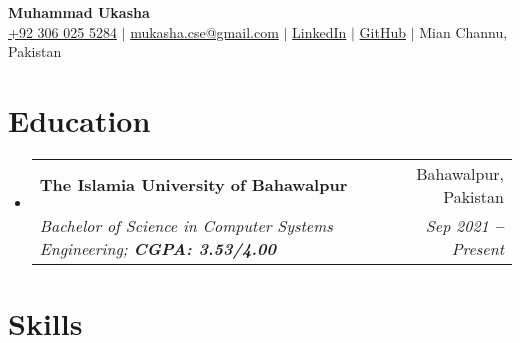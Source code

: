 \documentclass[a4paper,11pt]{article}
\makeatletter
\newcommand{\resumeEducationHeading}[4]{
  \vspace{-2pt}\item
    \begin{tabular*}{0.97\textwidth}[t]{l@{\extracolsep{\fill}}r}
      \textbf{#1} & #2 \\
      \textit{\small#3} & \textit{\small#4} \\
    \end{tabular*}\vspace{-5pt}
}
\newcommand{\resumeSubHeadingListStart}{\begin{itemize}[leftmargin=0.15in, label={}]}
\newcommand{\resumeSubHeadingListEnd}{\end{itemize}}
\makeatother
\begin{document}

\begin{center}
  \textbf{\Huge Muhammad Ukasha} \\ \vspace{3pt}
  \small
  \faMobile \hspace{.5pt} \href{tel:923004761002}{+92 306 025 5284}
  $|$
  \faAt \hspace{.5pt} \href{mailto:mukasha.cse@gmail.com}{mukasha.cse@gmail.com}
  $|$
  \faLinkedinSquare \hspace{.5pt} \href{www.linkedin.com/in/MUkasha09}{LinkedIn}
  $|$
  \faGithub \hspace{.5pt} \href{https://github.com/MUkasha09}{GitHub}
  $|$
  \faMapMarker \hspace{.5pt} {Mian Channu, Pakistan}
\end{center}



\section{Education}
\vspace{3pt}
\resumeSubHeadingListStart

\resumeEducationHeading
{The Islamia University of Bahawalpur}{Bahawalpur, Pakistan}
{Bachelor of Science in Computer Systems Engineering; \textbf{CGPA: 3.53/4.00}}{Sep 2021 \textbf{--} Present}

\resumeSubHeadingListEnd


\section{Skills}
\vspace{2pt}
\end{document}
